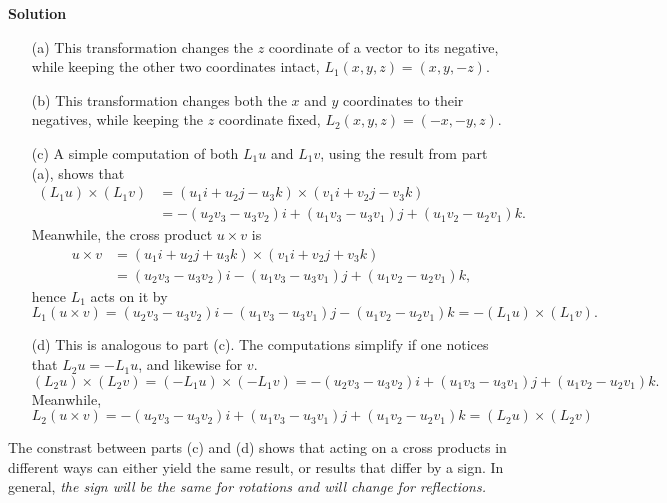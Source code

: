 \documentclass[12pt,oneside]{exam}
\newenvironment{newsolution}{\vspace{.1in}\noindent\textbf{Solution \hspace{.05em}}}{}
\begin{document}
\begin{newsolution}
\begin{itemize}
\item[(a)] This transformation changes the $z$ coordinate of a vector to its negative, while keeping the other two coordinates intact, $L_1(x,y,z)=(x,y,-z)$. 
\item[(b)] This transformation changes both the $x$ and $y$ coordinates to their negatives, while keeping the $z$ coordinate fixed, $L_2(x,y,z)=(-x,-y,z)$. 
\item[(c)] A simple computation of both $L_1 u $ and $L_1 v$, using the result from part (a), shows that 
\begin{align*}
(L_1 u) \times (L_1 v) & = (u_1 i + u_2 j - u_3k) \times (v_1 i + v_2 j - v_3 k)\\
& = -(u_2v_3 - u_3v_2)i + (u_1v_3-u_3v_1)j + (u_1v_2 - u_2v_1)k.
\end{align*}
Meanwhile, the cross product $u \times v$ is 
\begin{align*}
u \times v & = (u_1 i + u_2 j + u_3k) \times (v_1 i + v_2 j + v_3 k)\\
& = (u_2v_3-u_3v_2)i - (u_1v_3-u_3v_1)j + (u_1v_2-u_2v_1)k,
\end{align*}
hence $L_1$ acts on it by 
\begin{equation*}
L_1(u \times v) = (u_2v_3-u_3v_2)i - (u_1v_3-u_3v_1)j - (u_1v_2-u_2v_1)k = -(L_1 u) \times (L_1 v).
\end{equation*}
\item[(d)] This is analogous to part (c). The computations simplify if one notices that $L_2u=-L_1u$, and likewise for $v$.
\begin{equation*}
(L_2 u) \times (L_2 v) = (-L_1 u) \times (-L_1 v) =  -(u_2v_3 - u_3v_2)i + (u_1v_3-u_3v_1)j + (u_1v_2 - u_2v_1)k.
\end{equation*}
Meanwhile, 
\begin{equation*}
L_2(u \times v) = -(u_2v_3-u_3v_2)i + (u_1v_3-u_3v_1)j + (u_1v_2-u_2v_1)k = (L_2 u) \times (L_2 v)
\end{equation*}
\end{itemize}
The constrast between parts (c) and (d) shows that acting on a cross products in different ways can either yield the same result, or results that differ by a sign. In general, \textit{the sign will be the same for rotations and will change for reflections. }
\end{newsolution}
\end{document}
